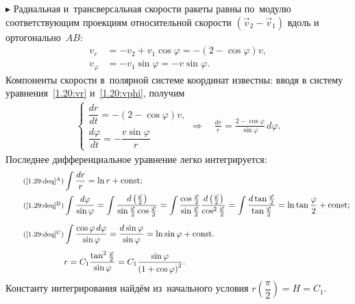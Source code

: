 \documentclass{weekly}
\begin{document}
$\blacktriangleright$ Радиальная и~трансверсальная скорости
ракеты равны по~модулю соответствующим проекциям относительной
скорости $(\vec v_2 - \vec v_1)$ вдоль и ортогонально~$AB$:
\begin{align}
    v_r &= -v_2 + v_1 \cos\varphi = -(2 - \cos\varphi)v,
        \label{1.29:vr}\\
    v_\varphi &= -v_1 \sin\varphi = -v \sin\varphi. \label{1.29:vphi}
\end{align}
Компоненты скорости в~полярной системе координат известны:
вводя в систему уравнения~\eqref{1.20:vr} и~\eqref{1.20:vphi},
получим
\begin{gather}
\begin{cases}
    \dfrac{dr}{dt} = -(2 - \cos\varphi) v, \\[3mm]
    \dfrac{d\varphi}{dt} = -\dfrac{v \sin\varphi}{r}
\end{cases} \Longrightarrow \quad
    \frac{dr}{r} = \frac{2-\cos\varphi}{\sin\varphi}\,d\varphi.
        \label{1.29:deq}
\end{gather}
Последнее дифференциальное уравнение легко интегрируется:
\begin{align}
\tag*{\footnotesize(\ref{1.29:deq}$^\text{A}$)}
    &\int \frac{dr}{r} = \ln r + \const; \\
\tag*{\footnotesize(\ref{1.29:deq}$^\text{B}$)}
    &\int \frac{d\varphi}{\sin\varphi}
    = \int \frac{d\left(\frac{\varphi}{2}\right)}
    {\sin\frac{\varphi}{2}\cos\frac{\varphi}{2}}
    = \int \frac{\cos\frac{\varphi}{2}}{\sin\frac{\varphi}{2}}
    \frac{d\left(\frac{\varphi}{2}\right)}{\cos^2\frac{\varphi}{2}}
    = \int \frac{d\tan\frac{\varphi}{2}}{\tan\frac{\varphi}{2}}
    = \ln\tan\frac{\varphi}{2} + \const; \\[2mm]
\tag*{\footnotesize(\ref{1.29:deq}$^\text{C}$)}
    &\int \frac{\cos\varphi\,d\varphi}{\sin\varphi}
    = \frac{d\sin\varphi}{\sin\varphi} = \ln\sin\varphi + \const.
        \\[1ex]
    &r = C_1 \frac{\tan^2\frac{\varphi}{2}}{\sin\varphi}
    = C_1 \frac{\sin\varphi}{\left( 1 + \cos\varphi \right)^2}.
        \label{1.29:r}
\end{align}
Константу интегрирования найдём из~начального условия
$r\!\left(\dfrac{\pi}{2}\right) = H = C_1$.
\end{document}
